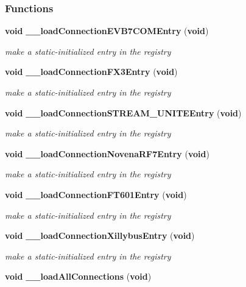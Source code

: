 \subsubsection*{Functions}
\begin{DoxyCompactItemize}
\item 
{\bf void} {\bf \+\_\+\+\_\+load\+Connection\+E\+V\+B7\+C\+O\+M\+Entry} ({\bf void})
\begin{DoxyCompactList}\small\item\em make a static-\/initialized entry in the registry \end{DoxyCompactList}\item 
{\bf void} {\bf \+\_\+\+\_\+load\+Connection\+F\+X3\+Entry} ({\bf void})
\begin{DoxyCompactList}\small\item\em make a static-\/initialized entry in the registry \end{DoxyCompactList}\item 
{\bf void} {\bf \+\_\+\+\_\+load\+Connection\+S\+T\+R\+E\+A\+M\+\_\+\+U\+N\+I\+T\+E\+Entry} ({\bf void})
\begin{DoxyCompactList}\small\item\em make a static-\/initialized entry in the registry \end{DoxyCompactList}\item 
{\bf void} {\bf \+\_\+\+\_\+load\+Connection\+Novena\+R\+F7\+Entry} ({\bf void})
\begin{DoxyCompactList}\small\item\em make a static-\/initialized entry in the registry \end{DoxyCompactList}\item 
{\bf void} {\bf \+\_\+\+\_\+load\+Connection\+F\+T601\+Entry} ({\bf void})
\begin{DoxyCompactList}\small\item\em make a static-\/initialized entry in the registry \end{DoxyCompactList}\item 
{\bf void} {\bf \+\_\+\+\_\+load\+Connection\+Xillybus\+Entry} ({\bf void})
\begin{DoxyCompactList}\small\item\em make a static-\/initialized entry in the registry \end{DoxyCompactList}\item 
{\bf void} {\bf \+\_\+\+\_\+load\+All\+Connections} ({\bf void})
\end{DoxyCompactItemize}


